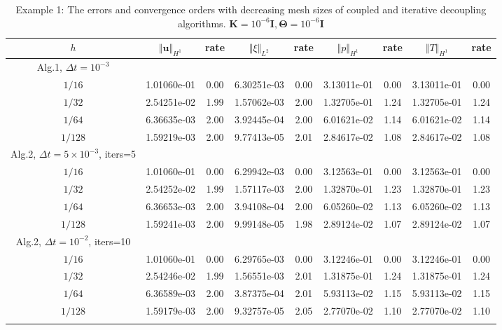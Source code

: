 \documentclass{article}
\numberwithin{equation}{section}
\begin{document}
\begin{table}[htbp]  \tiny  
\caption{Example 1: The errors and convergence orders with decreasing mesh sizes of
 coupled and iterative decoupling algorithms. $ \bm K=10^{-6}\bm{I},\bm\Theta=10^{-6}\bm{I}$ }
\centering
\begin{tabular}{ccccccccc}
\toprule
  $h$&$\Vert\bm u\Vert_{H^1}$ &rate &$\Vert\xi\Vert_{L^2}$ &rate &$\Vert p\Vert_{H^1}$ &rate&$\Vert T\Vert_{H^1}$ &rate \\ 
\midrule
Alg.1, $\Delta t=10^{-3}$\\
\midrule
$1/16$ & 1.01060e-01 & 0.00 & 6.30251e-03 & 0.00 & 3.13011e-01 & 0.00 & 3.13011e-01 & 0.00 \\
$1/32$ & 2.54251e-02 & 1.99 & 1.57062e-03 & 2.00 & 1.32705e-01 & 1.24 & 1.32705e-01 & 1.24 \\
$1/64$ & 6.36635e-03 & 2.00 & 3.92445e-04 & 2.00 & 6.01621e-02 & 1.14 & 6.01621e-02 & 1.14 \\
$1/128$ & 1.59219e-03 & 2.00 & 9.77413e-05 & 2.01 & 2.84617e-02 & 1.08 & 2.84617e-02 & 1.08 \\
\midrule
Alg.2, $\Delta t=5\times 10^{-3}$, iters=5 &\\
\midrule
$1/16$ & 1.01060e-01 & 0.00 & 6.29942e-03 & 0.00 & 3.12563e-01 & 0.00 & 3.12563e-01 & 0.00 \\
$1/32$ & 2.54252e-02 & 1.99 & 1.57117e-03 & 2.00 & 1.32870e-01 & 1.23 & 1.32870e-01 & 1.23 \\
$1/64$ & 6.36653e-03 & 2.00 & 3.94108e-04 & 2.00 & 6.05260e-02 & 1.13 & 6.05260e-02 & 1.13 \\
$1/128$ & 1.59241e-03 & 2.00 & 9.99148e-05 & 1.98 & 2.89124e-02 & 1.07 & 2.89124e-02 & 1.07 \\
\midrule
Alg.2, $\Delta t=10^{-2}$, iters=10 &\\
\midrule
$1/16$ & 1.01060e-01 & 0.00 & 6.29765e-03 & 0.00 & 3.12246e-01 & 0.00 & 3.12246e-01 & 0.00 \\
$1/32$ & 2.54246e-02 & 1.99 & 1.56551e-03 & 2.01 & 1.31875e-01 & 1.24 & 1.31875e-01 & 1.24 \\
$1/64$ & 6.36589e-03 & 2.00 & 3.87375e-04 & 2.01 & 5.93113e-02 & 1.15 & 5.93113e-02 & 1.15 \\
$1/128$ & 1.59179e-03 & 2.00 & 9.32757e-05 & 2.05 & 2.77070e-02 & 1.10 & 2.77070e-02 & 1.10 \\
\bottomrule
\label{tab:K Theta 1e-6}
\end{tabular}
\end{table} 
\end{document}
